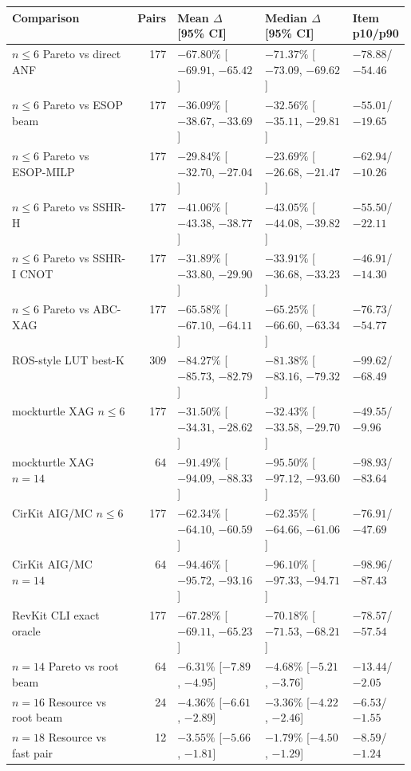\begin{tabularx}{\linewidth}{>{\raggedright\arraybackslash}Xr>{\raggedleft\arraybackslash}p{0.22\linewidth}>{\raggedleft\arraybackslash}p{0.22\linewidth}>{\raggedleft\arraybackslash}p{0.14\linewidth}}
\toprule
Comparison & Pairs & Mean $\Delta$ [95\% CI] & Median $\Delta$ [95\% CI] & Item p10/p90 \\
\midrule
$n\leq6$ Pareto vs direct ANF & 177 & $-67.80\%$ [$-69.91$, $-65.42$] & $-71.37\%$ [$-73.09$, $-69.62$] & $-78.88$/$-54.46$ \\
$n\leq6$ Pareto vs ESOP beam & 177 & $-36.09\%$ [$-38.67$, $-33.69$] & $-32.56\%$ [$-35.11$, $-29.81$] & $-55.01$/$-19.65$ \\
$n\leq6$ Pareto vs ESOP-MILP & 177 & $-29.84\%$ [$-32.70$, $-27.04$] & $-23.69\%$ [$-26.68$, $-21.47$] & $-62.94$/$-10.26$ \\
$n\leq6$ Pareto vs SSHR-H & 177 & $-41.06\%$ [$-43.38$, $-38.77$] & $-43.05\%$ [$-44.08$, $-39.82$] & $-55.50$/$-22.11$ \\
$n\leq6$ Pareto vs SSHR-I CNOT & 177 & $-31.89\%$ [$-33.80$, $-29.90$] & $-33.91\%$ [$-36.68$, $-33.23$] & $-46.91$/$-14.30$ \\
$n\leq6$ Pareto vs ABC-XAG & 177 & $-65.58\%$ [$-67.10$, $-64.11$] & $-65.25\%$ [$-66.60$, $-63.34$] & $-76.73$/$-54.77$ \\
ROS-style LUT best-K & 309 & $-84.27\%$ [$-85.73$, $-82.79$] & $-81.38\%$ [$-83.16$, $-79.32$] & $-99.62$/$-68.49$ \\
mockturtle XAG $n\leq6$ & 177 & $-31.50\%$ [$-34.31$, $-28.62$] & $-32.43\%$ [$-33.58$, $-29.70$] & $-49.55$/$-9.96$ \\
mockturtle XAG $n=14$ & 64 & $-91.49\%$ [$-94.09$, $-88.33$] & $-95.50\%$ [$-97.12$, $-93.60$] & $-98.93$/$-83.64$ \\
CirKit AIG/MC $n\leq6$ & 177 & $-62.34\%$ [$-64.10$, $-60.59$] & $-62.35\%$ [$-64.66$, $-61.06$] & $-76.91$/$-47.69$ \\
CirKit AIG/MC $n=14$ & 64 & $-94.46\%$ [$-95.72$, $-93.16$] & $-96.10\%$ [$-97.33$, $-94.71$] & $-98.96$/$-87.43$ \\
RevKit CLI exact oracle & 177 & $-67.28\%$ [$-69.11$, $-65.23$] & $-70.18\%$ [$-71.53$, $-68.21$] & $-78.57$/$-57.54$ \\
$n=14$ Pareto vs root beam & 64 & $-6.31\%$ [$-7.89$, $-4.95$] & $-4.68\%$ [$-5.21$, $-3.76$] & $-13.44$/$-2.05$ \\
$n=16$ Resource vs root beam & 24 & $-4.36\%$ [$-6.61$, $-2.89$] & $-3.36\%$ [$-4.22$, $-2.46$] & $-6.53$/$-1.55$ \\
$n=18$ Resource vs fast pair & 12 & $-3.55\%$ [$-5.66$, $-1.81$] & $-1.79\%$ [$-4.50$, $-1.29$] & $-8.59$/$-1.24$ \\
\bottomrule
\end{tabularx}
